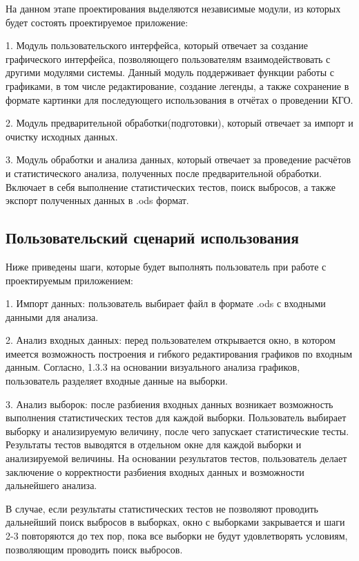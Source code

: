 На данном этапе проектирования выделяются независимые модули, из которых будет состоять проектируемое приложение:

1. Модуль пользовательского интерфейса, который отвечает за создание
графического интерфейса, позволяющего пользователям взаимодействовать с другими модулями системы. Данный модуль поддерживает функции работы с графиками, в том числе редактирование, создание легенды, а также сохранение в формате картинки для последующего использования в отчётах о проведении КГО.

2. Модуль предварительной обработки(подготовки), который
отвечает за импорт и очистку исходных данных.

3. Модуль обработки и анализа данных, который отвечает за проведение
расчётов и статистического анализа, полученных после предварительной
обработки. Включает в себя выполнение статистических тестов, поиск выбросов, а также экспорт полученных данных в .ods формат.

\subsection{Пользовательский сценарий использования} \label{Scenarii}

Ниже приведены шаги, которые будет выполнять пользователь при работе с проектируемым приложением:

1. Импорт данных: пользователь выбирает файл в формате .ods с входными данными для анализа.

2. Анализ входных данных: перед пользователем открывается окно, в котором имеется возможность построения и гибкого редактирования графиков по входным данным. Согласно, 1.3.3 на основании визуального анализа графиков, пользователь разделяет входные данные на выборки.

3. Анализ выборок: после разбиения входных данных возникает возможность выполнения статистических тестов для каждой выборки. Пользователь выбирает выборку и анализируемую величину, после чего запускает статистические тесты. Результаты тестов выводятся в отдельном окне для каждой выборки и анализируемой величины. На основании результатов тестов, пользователь делает заключение о корректности разбиения входных данных и возможности дальнейшего анализа.

В случае, если результаты статистических тестов не позволяют проводить дальнейший поиск выбросов в выборках, окно с выборками закрывается и шаги 2-3 повторяются до тех пор, пока все выборки не будут удовлетворять условиям, позволяющим проводить поиск выбросов.

